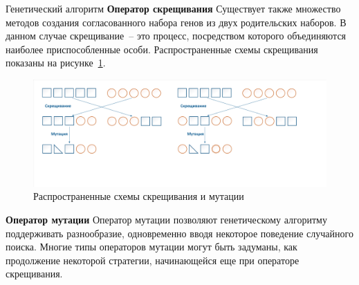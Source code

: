 \documentclass[aspectratio=169, mathserif]{beamer}	%
\begin{document}
\begin{frame}[fragile]{Генетический алгоритм}
\scriptsize
\alert{\textbf{Оператор скрещивания}}
Существует также множество методов создания согласованного набора генов из двух родительских наборов. В данном случае скрещивание~-- это процесс, посредством которого объединяются наиболее приспособленные особи. Распространенные схемы скрещивания показаны на рисунке~\ref{fig:crossover}.
\vfill
\begin{figure}[h!]
	\centering
	\includegraphics[width=.8\textwidth]{pics/crossover}
	\caption{Распространенные схемы скрещивания и мутации}
	\label{fig:crossover}
\end{figure}
\vfill
\alert{\textbf{Оператор мутации}}
Оператор мутации позволяют генетическому алгоритму поддерживать разнообразие, одновременно вводя некоторое поведение случайного поиска. Многие типы операторов мутации могут быть задуманы, как продолжение некоторой стратегии,  начинающейся еще при операторе скрещивания.
\vfill
\end{frame}
\end{document}
